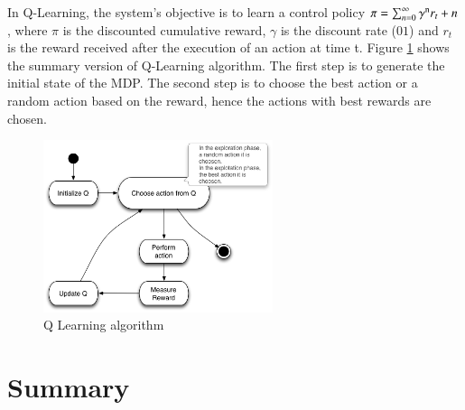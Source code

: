 \documentclass[espaco=umemeio,chapter=TITLE,twoside,openright]{abnt}
\begin{document}
In Q-Learning, the system's objective is to learn a control policy $\pi = \sum_{n=0}^{\infty} \gamma\textsuperscript{n}  r_{t}+n $, where $\pi$  is the discounted cumulative reward, $\gamma$ is the discount rate ($01$) and $r_{t}$ is the reward received after  the execution of an action at time t. Figure \ref{fig:qalgo} shows the summary version of Q-Learning algorithm. The first step is to generate the initial state of the MDP. The second step is to choose the best action or a random action based on the reward, hence the actions with best rewards are chosen.

\begin{figure}[h]
\centering
\includegraphics[width=0.6\textwidth]{./images/qalgo.png}
\caption{Q Learning algorithm}
\label{fig:qalgo}
\end{figure}

\section{Summary}
\end{document}
